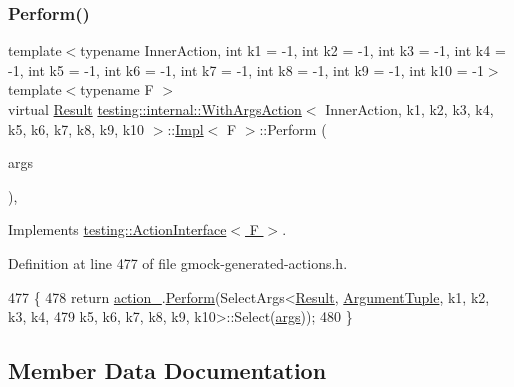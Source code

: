 \subsubsection{\texorpdfstring{Perform()}{Perform()}}
{\footnotesize\ttfamily template$<$typename Inner\+Action, int k1 = -\/1, int k2 = -\/1, int k3 = -\/1, int k4 = -\/1, int k5 = -\/1, int k6 = -\/1, int k7 = -\/1, int k8 = -\/1, int k9 = -\/1, int k10 = -\/1$>$ \\
template$<$typename F $>$ \\
virtual \hyperlink{classtesting_1_1ActionInterface_a7477de2fe3e4e01c59db698203acaee7}{Result} \hyperlink{classtesting_1_1internal_1_1WithArgsAction}{testing\+::internal\+::\+With\+Args\+Action}$<$ Inner\+Action, k1, k2, k3, k4, k5, k6, k7, k8, k9, k10 $>$\+::\hyperlink{classtesting_1_1internal_1_1WithArgsAction_1_1Impl}{Impl}$<$ F $>$\+::Perform (\begin{DoxyParamCaption}\item[{const \hyperlink{classtesting_1_1ActionInterface_af72720d864da4d606629e83edc003511}{Argument\+Tuple} \&}]{args }\end{DoxyParamCaption})\hspace{0.3cm}{\ttfamily [inline]}, {\ttfamily [virtual]}}



Implements \hyperlink{classtesting_1_1ActionInterface_a20f8624fcea1786f2992b358760422a0}{testing\+::\+Action\+Interface$<$ F $>$}.



Definition at line 477 of file gmock-\/generated-\/actions.\+h.


\begin{DoxyCode}
477                                                       \{
478       \textcolor{keywordflow}{return} \hyperlink{classtesting_1_1internal_1_1WithArgsAction_1_1Impl_aa36bb75797d43eb853a92f02ca3e0dec}{action\_}.\hyperlink{classtesting_1_1Action_ad00a03062885685da84b308e6e8ff4cb}{Perform}(SelectArgs<\hyperlink{classtesting_1_1internal_1_1WithArgsAction_1_1Impl_a967047b99af8f852f4fa2883be283e1a}{Result}, 
      \hyperlink{classtesting_1_1internal_1_1WithArgsAction_1_1Impl_ae75850936c5448a83f79267d6a2f1903}{ArgumentTuple}, k1, k2, k3, k4,
479           k5, k6, k7, k8, k9, k10>::Select(\hyperlink{namespacegenerate__debs_a75f9143e38df82d83b2e8a6f99cae02c}{args}));
480     \}
\end{DoxyCode}


\subsection{Member Data Documentation}
\mbox{\label{classtesting_1_1internal_1_1WithArgsAction_1_1Impl_aa36bb75797d43eb853a92f02ca3e0dec}} 
